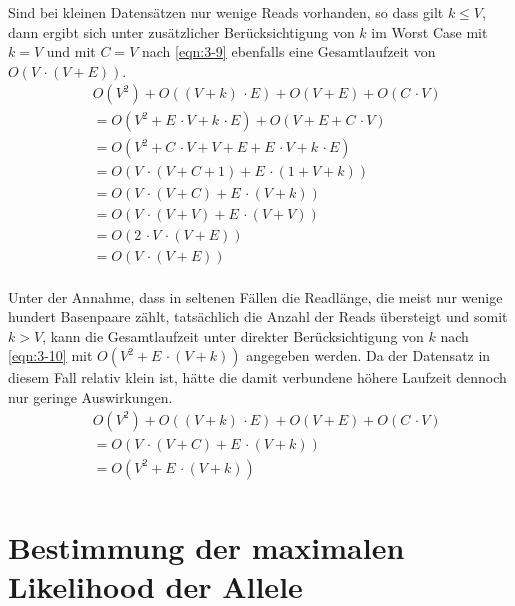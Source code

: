 Sind bei kleinen Datensätzen nur wenige Reads vorhanden, so dass gilt $ k \leq V $, dann ergibt sich unter zusätzlicher Berücksichtigung von $ k $ im Worst Case mit $ k = V $ und mit $ C = V $ nach \eqref{eqn:3-9} ebenfalls eine Gesamtlaufzeit von $ O(V \, \cdotp (V + E)) $.
\begin{equation} \label{eqn:3-9}
\tag{3-9}
\begin{aligned}
&\ {} O(V^2) + O((V + k) \, \cdotp E) + O(V + E) + O(C \, \cdotp V) \\
& \ = O(V^2 + E \, \cdotp V + k \, \cdotp E) + O(V + E + C \, \cdotp V)\\
&\ = O(V^2 + C \, \cdotp V + V + E + E \, \cdotp V + k \, \cdotp E) \\
&\ = O(V \, \cdotp (V + C + 1) + E \, \cdotp (1 + V + k))\\
&\ = O(V \, \cdotp (V + C) + E \, \cdotp (V + k))\\
&\ = O(V \, \cdotp (V + V) + E \, \cdotp (V + V))\\
&\ = O( 2 \, \cdotp V \, \cdotp (V + E))\\
&\ = O(V \, \cdotp (V + E))\\
\end{aligned}
\end{equation}

Unter der Annahme, dass in seltenen Fällen die Readlänge, die meist nur wenige hundert Basenpaare zählt, tatsächlich die Anzahl der Reads übersteigt und somit $ k > V $, kann die Gesamtlaufzeit unter direkter Berücksichtigung von $ k $ nach \eqref{eqn:3-10} mit $ O(V^2 + E \, \cdotp (V + k)) $ angegeben werden. Da der Datensatz in diesem Fall relativ klein ist, hätte die damit verbundene höhere Laufzeit dennoch nur geringe Auswirkungen.
\begin{equation} \label{eqn:3-10}
\tag{3-10}
\begin{aligned}
&\ {} O(V^2) + O((V + k) \, \cdotp E) + O(V + E) + O(C \, \cdotp V) \\
&\ = O(V \, \cdotp (V + C) + E \, \cdotp (V + k))\\
&\ = O(V^2 + E \, \cdotp (V + k))\\
\end{aligned}
\end{equation}

\section{Bestimmung der maximalen Likelihood der Allele} \label{sec:lh_allele}

